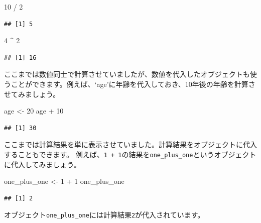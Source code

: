 \documentclass[
]{book}
\newenvironment{Shaded}{\begin{snugshade}}{\end{snugshade}}
\newcommand{\DecValTok}[1]{\textcolor[rgb]{0.00,0.00,0.81}{#1}}
\newcommand{\NormalTok}[1]{#1}
\newcommand{\OtherTok}[1]{\textcolor[rgb]{0.56,0.35,0.01}{#1}}
\newcommand{\SpecialCharTok}[1]{\textcolor[rgb]{0.00,0.00,0.00}{#1}}
\begin{document}
\begin{Shaded}
\begin{Highlighting}[]
\DecValTok{10} \SpecialCharTok{/} \DecValTok{2}
\end{Highlighting}
\end{Shaded}

\begin{verbatim}
## [1] 5
\end{verbatim}

\begin{Shaded}
\begin{Highlighting}[]
\DecValTok{4} \SpecialCharTok{\^{}} \DecValTok{2}
\end{Highlighting}
\end{Shaded}

\begin{verbatim}
## [1] 16
\end{verbatim}

ここまでは数値同士で計算させていましたが、数値を代入したオブジェクトも使うことができます。例えば、`age'に年齢を代入しておき、10年後の年齢を計算させてみましょう。

\begin{Shaded}
\begin{Highlighting}[]
\NormalTok{age }\OtherTok{\textless{}{-}} \DecValTok{20}
\NormalTok{age }\SpecialCharTok{+} \DecValTok{10}
\end{Highlighting}
\end{Shaded}

\begin{verbatim}
## [1] 30
\end{verbatim}

ここまでは計算結果を単に表示させていました。計算結果をオブジェクトに代入することもできます。
例えば、\texttt{1\ +\ 1}の結果を\texttt{one\_plus\_one}というオブジェクトに代入してみましょう。

\begin{Shaded}
\begin{Highlighting}[]
\NormalTok{one\_plus\_one }\OtherTok{\textless{}{-}} \DecValTok{1} \SpecialCharTok{+} \DecValTok{1}
\NormalTok{one\_plus\_one}
\end{Highlighting}
\end{Shaded}

\begin{verbatim}
## [1] 2
\end{verbatim}

オブジェクト\texttt{one\_plus\_one}には計算結果\texttt{2}が代入されています。
\end{document}
